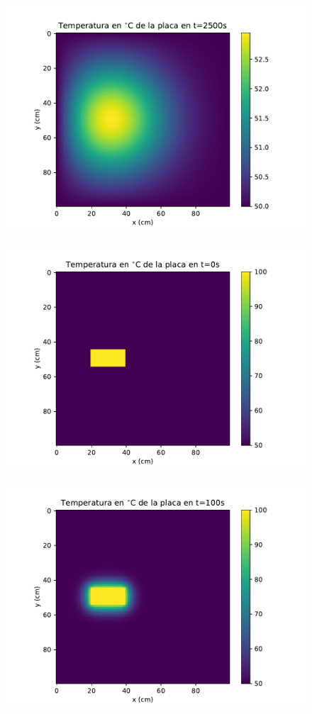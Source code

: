 \documentclass[12pt,letterpaper]{article}
\begin{document}
\begin{figure}[ht]
\includegraphics{f1_2500.pdf}
\centering
\end{figure}

\begin{figure}[ht]
\includegraphics{f2_0.pdf}
\centering
\end{figure}

\begin{figure}[ht]
\includegraphics{f2_100.pdf}
\centering
\end{figure}
\end{document}
